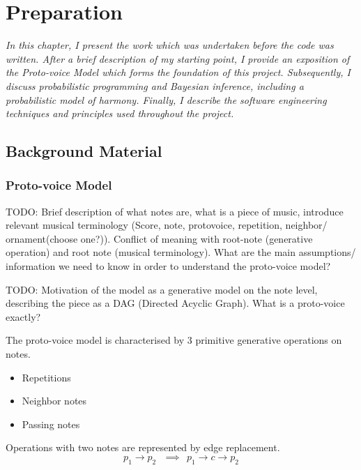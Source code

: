 \documentclass[12pt,a4paper,twoside,openright]{report}
\begin{document}

\chapter{Preparation}
\textit{In this chapter, I present the work which was undertaken before the code was written. After a brief description of my starting point, I provide an exposition of the Proto-voice Model which forms the foundation of this project. Subsequently, I discuss probabilistic programming and Bayesian inference, including a probabilistic model of harmony. Finally, I describe the software engineering techniques and principles used throughout the project. }

\section{Background Material}

\subsection{Proto-voice Model}
TODO: Brief description of what notes are, what is a piece of music, introduce relevant musical terminology (Score, note, protovoice, repetition, neighbor/ ornament(choose one?)). Conflict of meaning with root-note (generative operation) and root note (musical terminology). What are the main assumptions/ information we need to know in order to understand the proto-voice model?

\par
TODO: Motivation of the model as a generative model on the note level, describing the piece as a DAG (Directed Acyclic Graph). What is a proto-voice exactly? 
\par 

The proto-voice model is characterised by 3 primitive generative operations on notes.

\begin{itemize}
 \item Repetitions 
  \item Neighbor notes 
  \item Passing notes
\end{itemize}

Operations with two notes are represented by edge replacement. 
\[p_1 \to p_2 ~~~\implies~~ p_1 \to c \to p_2 \label{edge replacement}\]
\end{document}

